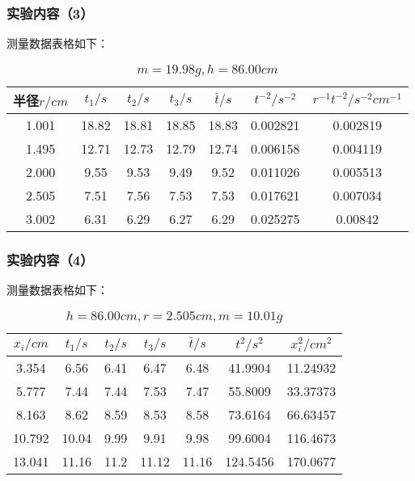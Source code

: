 \documentclass{ctexart}
\begin{document}
      \subsubsection{实验内容（3）}
      测量数据表格如下：
\begin{table}[H]
  \centering
  \caption{$m=19.98g,h=86.00cm$}
    \begin{tabular}{|c|c|c|c|c|c|c|}\hline
    {半径$r/cm$} & {$t_1/s$} & {$t_2/s$} & {$t_3/s$} & {$\bar{t}/s$} & {$t^{-2}/s^{-2}$} & {$r^{-1}t^{-2}/s^{-2}cm^{-1}$} \\\hline
    1.001  & 18.82 & 18.81 & 18.85 & 18.83 & 0.002821 & 0.002819 \\\hline
    1.495  & 12.71 & 12.73 & 12.79 & 12.74 & 0.006158 & 0.004119 \\\hline
    2.000  & 9.55  & 9.53  & 9.49  & 9.52  & 0.011026 & 0.005513 \\\hline
    2.505  & 7.51  & 7.56  & 7.53  & 7.53  & 0.017621 & 0.007034 \\\hline
    3.002  & 6.31  & 6.29  & 6.27  & 6.29  & 0.025275 & 0.00842 \\\hline
    \end{tabular}%
  \label{tab:addlabel}%
\end{table}%

      \subsubsection{实验内容（4）}
      测量数据表格如下：
\begin{table}[H]
  \centering
  \caption{$h=86.00cm,r=2.505cm,m=10.01g$}
    \begin{tabular}{|c|c|c|c|c|c|c|}\hline
    {$x_i/cm$} & {$t_1/s$} & {$t_2/s$} & {$t_3/s$} & {$\bar{t}/s$} & {$t^2/s^2$} & {$x_i^2/cm^2$} \\\hline
    3.354 & 6.56  & 6.41  & 6.47  & 6.48  & 41.9904 & 11.24932 \\\hline
    5.777 & 7.44  & 7.44  & 7.53  & 7.47  & 55.8009 & 33.37373 \\\hline
    8.163 & 8.62  & 8.59  & 8.53  & 8.58  & 73.6164 & 66.63457 \\\hline
    10.792 & 10.04 & 9.99  & 9.91  & 9.98  & 99.6004 & 116.4673 \\\hline
    13.041 & 11.16 & 11.2  & 11.12 & 11.16 & 124.5456 & 170.0677 \\\hline
    \end{tabular}%
  \label{tab:addlabel}%
\end{table}%
\end{document}
